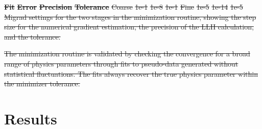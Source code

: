 \documentclass[
    aps,
    prd,
    reprint,
    amsmath,
    amssymb,
    nofootinbib,
    linenumbers,
    superscriptaddress,
    floatfix
]{revtex4-2}
\providecommand{\DIFdeltex}[1]{{\protect\color{red}\sout{#1}}}                      %
\providecommand{\DIFdelend}{} %
\providecommand{\DIFdelFL}[1]{\DIFdel{#1}} %
\providecommand{\DIFdel}[1]{\texorpdfstring{\DIFdeltex{#1}}{}} %
\DeclareRobustCommand{\DIFdelend}{\DIFOaddend \let\includegraphics\DIFOincludegraphics} %
\begin{document}
\textbf{\DIFdelFL{Fit}} %
\textbf{\DIFdelFL{Error}} %
\textbf{\DIFdelFL{Precision}} %
\textbf{\DIFdelFL{Tolerance}} %
\DIFdelFL{Coarse }%
\DIFdelFL{1e-1 }%
\DIFdelFL{1e-8 }%
\DIFdelFL{1e-1 }%
\DIFdelFL{Fine }%
\DIFdelFL{1e-5 }%
\DIFdelFL{1e-14 }%
\DIFdelFL{1e-5 }%
{%
\DIFdelFL{Migrad settings for the two stages in the minimization routine, showing the step size for the numerical gradient estimation, the precision of the LLH calculation, and the tolerance.}}

\DIFdel{The minimization routine is validated by checking the convergence for a broad range of physics parameters through fits to pseudo-data generated without statistical fluctuations.
The fits always recover the true physics parameter within the minimizer tolerance.
}%

\DIFdelend %

\section{\label{sec:results}Results}
\end{document}

